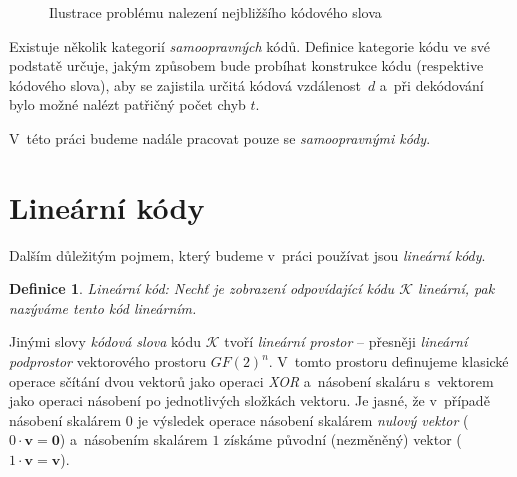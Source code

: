 \documentclass[thesis=M,czech,hidelinks]{FITthesis}[2012/06/26]
\newcommand{\0}{{\textcolor[gray]{0.75}{0}}}
\newtheorem{definice}{Definice}
\begin{document}
\begin{figure}
    \centering
    \quad
    \label{obr_kvzd}
    \caption{Ilustrace problému nalezení nejbližšího kódového slova}
\end{figure}

Existuje několik kategorií \emph{samoopravných} kódů. Definice kategorie kódu ve
své podstatě určuje, jakým způsobem bude probíhat konstrukce kódu (respektive
kódového slova), aby se zajistila určitá kódová vzdálenost~$d$ a~při dekódování
bylo možné nalézt patřičný počet chyb $t$.

V~této práci budeme nadále pracovat pouze se \emph{samoopravnými kódy}.



\section{Lineární kódy}\label{kap_linearni_kody}
Dalším důležitým pojmem, který budeme v~práci používat jsou \emph{lineární
kódy}.

\begin{definice}{Lineární kód:}
    Nechť je zobrazení odpovídající kódu $\mathcal{K}$ \emph{lineární},
    pak nazýváme tento kód \emph{lineárním}.
\end{definice}

Jinými slovy \emph{kódová slova} kódu $\mathcal{K}$ tvoří \emph{lineární
prostor} -- přesněji \emph{lineární podprostor} vektorového prostoru $GF(2)^n$.
V~tomto prostoru definujeme klasické operace sčítání dvou vektorů jako operaci
\emph{XOR} a~násobení skaláru s~vektorem jako operaci násobení po jednotlivých
složkách vektoru. Je jasné, že v~případě násobení skalárem $0$ je výsledek
operace násobení skalárem \emph{nulový vektor} ($0 \cdot \mathbf{v} = \mathbf{0}$)
a~násobením skalárem $1$ získáme původní (nezměněný) vektor
($1 \cdot \mathbf{v} = \mathbf{v}$).
\end{document}
